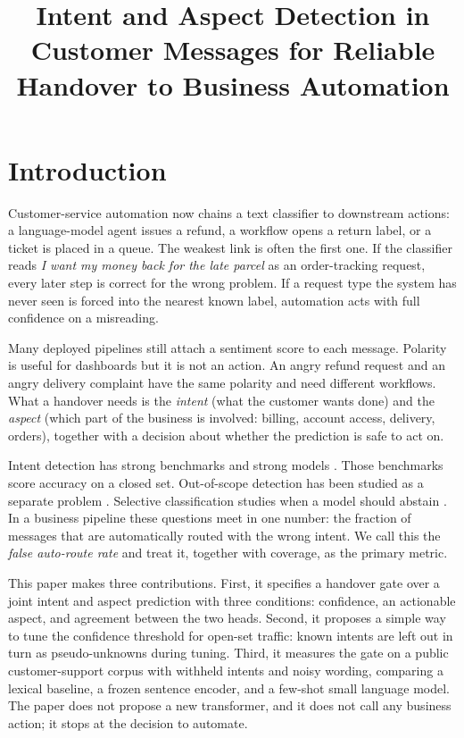 \documentclass{icaiit2027}
\title{Intent and Aspect Detection in Customer Messages for Reliable Handover to Business Automation}
\begin{document}
\maketitle

\section{Introduction}

Customer-service automation now chains a text classifier to downstream actions: a language-model agent issues a refund, a workflow opens a return label, or a ticket is placed in a queue. The weakest link is often the first one. If the classifier reads \emph{I want my money back for the late parcel} as an order-tracking request, every later step is correct for the wrong problem. If a request type the system has never seen is forced into the nearest known label, automation acts with full confidence on a misreading.

Many deployed pipelines still attach a sentiment score to each message. Polarity is useful for dashboards but it is not an action. An angry refund request and an angry delivery complaint have the same polarity and need different workflows. What a handover needs is the \emph{intent} (what the customer wants done) and the \emph{aspect} (which part of the business is involved: billing, account access, delivery, orders), together with a decision about whether the prediction is safe to act on.

Intent detection has strong benchmarks and strong models \cite{casanueva2020,larson2019,liu2021}. Those benchmarks score accuracy on a closed set. Out-of-scope detection has been studied as a separate problem \cite{larson2019,lin2019,zhang2021}. Selective classification studies when a model should abstain \cite{geifman2017}. In a business pipeline these questions meet in one number: the fraction of messages that are automatically routed with the wrong intent. We call this the \emph{false auto-route rate} and treat it, together with coverage, as the primary metric.

This paper makes three contributions. First, it specifies a handover gate over a joint intent and aspect prediction with three conditions: confidence, an actionable aspect, and agreement between the two heads. Second, it proposes a simple way to tune the confidence threshold for open-set traffic: known intents are left out in turn as pseudo-unknowns during tuning. Third, it measures the gate on a public customer-support corpus with withheld intents and noisy wording, comparing a lexical baseline, a frozen sentence encoder, and a few-shot small language model. The paper does not propose a new transformer, and it does not call any business action; it stops at the decision to automate.
\end{document}
